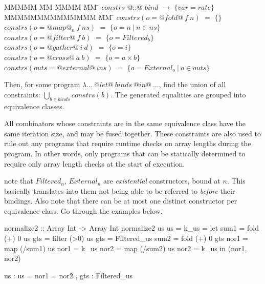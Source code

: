 \begin{tabbing}
MMMMM       \= MM \= MMMM \= MM \= \kill
$constrs$  \> @::@  \> $bind$  \> $\to$ \> $\{var = rate\}$ \\
MMMMMMMMMMMMMM               \= MM  \= \kill
$constrs(o = @fold@~f~n)  $ \> $=$ \> $\{\}$     \\
$constrs(o = @map@_n~f~ns)$ \> $=$ \> $\{o = n~|~n \in ns\}$     \\
$constrs(o = @filter@~f~b)$ \> $=$ \> $\{o = Filtered_b\}$              \\
$constrs(o = @gather@~i~d)$ \> $=$ \> $\{o = i\}$ \\
$constrs(o = @cross@~a~b) $ \> $=$ \> $\{o = a \times b\}$ \\
$constrs(outs = @external@~ins) $ \> $=$ \> $\{o = External_o~|~o \in outs\}$ \\
\end{tabbing}

Then, for some program $\lambda\ldots~@let@~binds~@in@~\ldots$, find the union of all constraints:
$\bigcup_{b \in binds} constrs(b)$.
The generated equalities are grouped into equivalence classes.

All combinators whose constraints are in the same equivalence class have the same iteration size, and may be fused together.
These constraints are also used to rule out any programs that require runtime checks on array lengths during the program.
In other words, only programs that can be statically determined to require only array length checks at the start of execution.

 note that $Filtered_n$, $External_n$ are \emph{existential} constructors, bound at $n$.
This basically translates into them not being able to be referred to \emph{before} their bindings.
Also note that there can be at most one distinct constructor per equivalence class.
Go through the examples below.


\begin{code}
 normalize2 :: Array Int -> Array Int
 normalize2 us                   {us   = k_us}
  = let sum1 = fold   (+) 0 us   
        gts  = filter (>0)  us   {gts  = Filtered_us}
        sum2 = fold   (+) 0 gts   
        nor1 = map  (/sum1) us   {nor1 = k_us}
        nor2 = map  (/sum2) us   {nor2 = k_us}
    in (nor1, nor2)
\end{code}

\begin{code}
 { us   : us = nor1 = nor2
 , gts  : Filtered_us }
\end{code}

